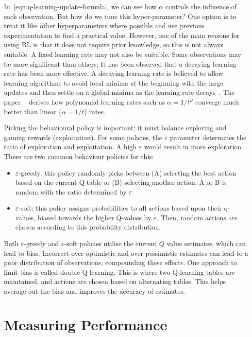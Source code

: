 \documentclass[]{final_report}
\begin{document}
In~\ref{eqn:q-learning-update-formula}, we can see how $\alpha$ controls the influence of each observation. But how do we tune this hyper-parameter? One option is to treat it like other hyperparameters where possible and use previous experimentation to find a practical value. However, one of the main reasons for using RL is that it does not require prior knowledge, so this is not always suitable. A fixed learning rate may not also be suitable. Some observations may be more significant than others; It has been observed that a decaying learning rate has been more effective. A decaying learning rate is believed to allow learning algorithms to avoid local minima at the beginning with the large updates and then settle on a global minima as the learning rate decays~\cite{decayingLearningRates}. The paper ~\cite{even2003learning} derives how polynomial learning rates such as $\alpha = 1/t^\omega$ converge much better than linear ($\alpha = 1/t$) rates.

Picking the behavioural policy is important; it must balance exploring and gaining rewards (exploitation). For some policies, the $\varepsilon$ parameter determines the ratio of exploration and exploitation. A high $\varepsilon$ would result in more exploration. There are two common behaviour policies for this:
\begin{itemize}
  \item $\varepsilon$-greedy: this policy randomly picks between (A) selecting the best action based on the current Q-table or (B) selecting another action. A or B is random with the ratio determined by $\varepsilon$
  \item $\varepsilon$-soft: this policy assigns probabilities to all actions based upon their q-values, biased towards the higher Q-values by $\varepsilon$. Then, random actions are chosen according to this probability distribution.
\end{itemize}

Both $\varepsilon$-greedy and $\varepsilon$-soft policies utilise the current $Q$ value estimates, which can lead to bias. Incorrect over-optimistic and over-pessimistic estimates can lead to a poor distribution of observations, compounding these effects. One approach to limit bias is called double Q-learning. This is where two Q-learning tables are maintained, and actions are chosen based on alternating tables. This helps average out the bias and improves the accuracy of estimates.


\section{Measuring Performance}\label{section:measuring-performance}
\end{document}
